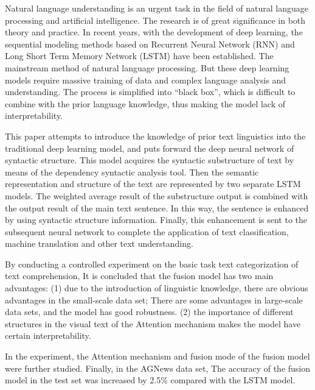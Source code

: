 \documentclass[bachelor,adobefonts]{jnuthesis}
\begin{document}
\begin{englishabstract}
Natural language understanding is an urgent task in the field of natural language processing and artificial intelligence.
The research is of great significance in both theory and practice.
In recent years, with the development of deep learning, the sequential modeling methods based on Recurrent Neural Network (RNN) and Long Short Term Memory Network (LSTM) have been established.
The mainstream method of natural language processing.
But these deep learning models require massive training of data and complex language analysis and understanding.
The process is simplified into “black box”, which is difficult to combine with the prior language knowledge, thus making the model lack of interpretability.
  
This paper attempts to introduce the knowledge of prior text linguistics into the traditional deep learning model, and puts forward the deep neural network of syntactic structure.
This model acquires the syntactic substructure of text by means of the dependency syntactic analysis tool.
Then the semantic representation and structure of the text are represented by two separate LSTM models.
The weighted average result of the substructure output is combined with the output result of the main text sentence.
In this way, the sentence is enhanced by using syntactic structure information. Finally, this enhancement is sent to the subsequent neural network to complete the application of text classification, machine translation and other text understanding.
  
By conducting a controlled experiment on the basic task text categorization of text comprehension,
It is concluded that the fusion model has two main advantages:
(1) due to the introduction of linguistic knowledge, there are obvious advantages in the small-scale data set; There are some advantages in large-scale data sets, and the model has good robustness.
(2) the importance of different structures in the visual text of the Attention mechanism makes the model have certain interpretability.
  
In the experiment, the Attention mechanism and fusion mode of the fusion model were further studied. Finally, in the AGNews data set,
The accuracy of the fusion model in the test set was increased by 2.5\% compared with the LSTM model.
\end{englishabstract}
\end{document}
